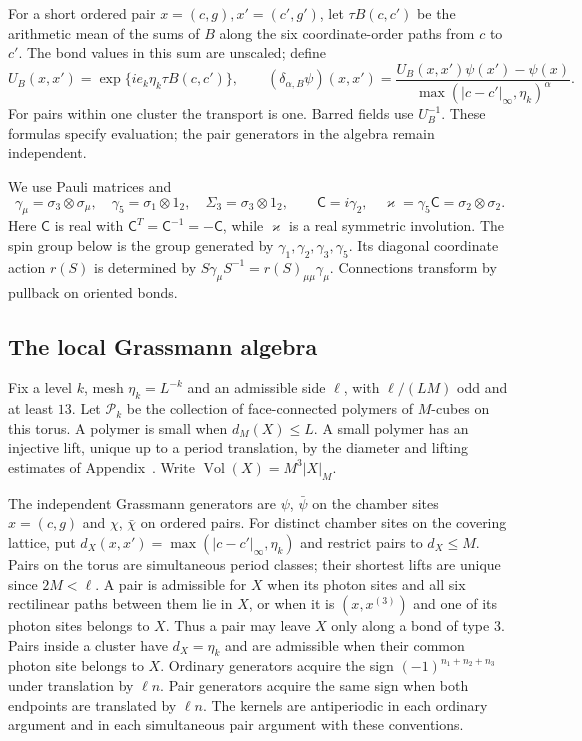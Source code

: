 For a short ordered pair \(x=(c,g),x'=(c',g')\), let
\(\tau B(c,c')\) be the arithmetic mean of the sums of \(B\)
along the six coordinate-order paths from \(c\) to \(c'\).
The bond values in this sum are unscaled; define
\[
 U_B(x,x')=\exp\{ie_k\eta_k\tau B(c,c')\},\qquad
 (\delta_{\alpha,B}\psi)(x,x')
       =\frac{U_B(x,x')\psi(x')-\psi(x)}
                    {\max(|c-c'|_\infty,\eta_k)^\alpha}.
\]
For pairs within one cluster the transport is one. Barred fields
use \(U_B^{-1}\). These formulas specify evaluation; the pair
generators in the algebra remain independent.

We use Pauli matrices and
\[
 \gamma_\mu=\sigma_3\otimes\sigma_\mu,\quad
 \gamma_5=\sigma_1\otimes1_2,\quad \Sigma_3=\sigma_3\otimes1_2,
 \qquad
 \mathsf C=i\gamma_2,\quad
 \varkappa=\gamma_5\mathsf C=\sigma_2\otimes\sigma_2 .
\]
Here \(\mathsf C\) is real with
\(\mathsf C^T=\mathsf C^{-1}=-\mathsf C\), while
\(\varkappa\) is a real symmetric involution. The spin group below
is the group generated by \(\gamma_1,\gamma_2,\gamma_3,\gamma_5\).
Its diagonal coordinate action \(r(S)\) is determined by
\(S\gamma_\mu S^{-1}=r(S)_{\mu\mu}\gamma_\mu\).
Connections transform by pullback on oriented bonds.

\subsection{The local Grassmann algebra}
\label{subsec:rg-activity-spaces}

Fix a level $k$, mesh $\eta_k=L^{-k}$ and an admissible side
$\ell$, with $\ell/(LM)$ odd and at least $13$.
Let $\mathcal P_k$ be the collection of face-connected polymers
of $M$-cubes on this torus. A polymer is small when
$d_M(X)\le L$. A small polymer has an injective lift, unique up
to a period translation, by the diameter and lifting estimates
of Appendix~.
Write $\operatorname{Vol}(X)=M^3|X|_M$.

The independent Grassmann generators are $\psi$, $\bar\psi$ on
the chamber sites $x=(c,g)$ and $\chi$, $\bar\chi$ on ordered
pairs. For distinct chamber sites on the covering lattice, put
$d_X(x,x')=\max(|c-c'|_\infty,\eta_k)$ and restrict pairs to
$d_X\le M$. Pairs on the torus are simultaneous period classes;
their shortest lifts are unique since $2M<\ell$. A pair is
admissible for $X$ when its photon sites and all six rectilinear
paths between them lie in $X$, or when it is $(x,x^{(3)})$ and
one of its photon sites belongs to $X$.
Thus a pair may leave $X$ only along a bond of type $3$.
Pairs inside a cluster have $d_X=\eta_k$ and are admissible when
their common photon site belongs to $X$.
Ordinary generators acquire the sign $(-1)^{n_1+n_2+n_3}$
under translation by $\ell n$. Pair generators acquire the same
sign when both endpoints are translated by $\ell n$.
The kernels are antiperiodic in each ordinary argument and in
each simultaneous pair argument with these conventions.

